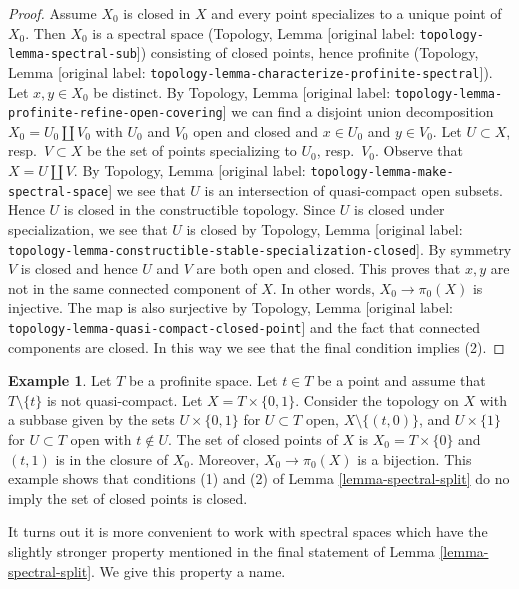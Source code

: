 \documentclass[10pt,a4paper]{article}
\theoremstyle{plain}
\theoremstyle{definition}
\newtheorem{example}[subsection]{Example}
\theoremstyle{remark}
\numberwithin{equation}{subsection}
\begin{document}
\begin{proof}
\medskip\noindent
Assume $X_0$ is closed in $X$ and every point specializes to a unique
point of $X_0$. Then $X_0$ is a spectral space
(Topology, Lemma \textnormal{[original label: \nolinkurl{topology-lemma-spectral-sub}]})
consisting of closed points, hence profinite
(Topology, Lemma \textnormal{[original label: \nolinkurl{topology-lemma-characterize-profinite-spectral}]}).
Let $x, y \in X_0$ be distinct. By
Topology, Lemma \textnormal{[original label: \nolinkurl{topology-lemma-profinite-refine-open-covering}]}
we can find a disjoint union decomposition
$X_0 = U_0 \amalg V_0$ with $U_0$ and $V_0$ open and closed
and $x \in U_0$ and $y \in V_0$.
Let $U \subset X$, resp.\ $V \subset X$
be the set of points specializing to $U_0$, resp.\ $V_0$.
Observe that $X = U \amalg V$.
By Topology, Lemma \textnormal{[original label: \nolinkurl{topology-lemma-make-spectral-space}]}
we see that $U$ is an intersection of quasi-compact open subsets.
Hence $U$ is closed in the constructible topology.
Since $U$ is closed under specialization, we see that
$U$ is closed by Topology, Lemma
\textnormal{[original label: \nolinkurl{topology-lemma-constructible-stable-specialization-closed}]}.
By symmetry $V$ is closed and hence $U$ and $V$ are both
open and closed.
This proves that $x, y$ are not in the same connected component of $X$.
In other words, $X_0 \to \pi_0(X)$ is injective. The map is also
surjective by
Topology, Lemma \textnormal{[original label: \nolinkurl{topology-lemma-quasi-compact-closed-point}]}
and the fact that connected components are closed.
In this way we see that the final condition implies (2).
\end{proof}

\begin{example}
\label{example-not-w-local}
Let $T$ be a profinite space. Let $t \in T$ be a point and assume
that $T \setminus \{t\}$ is not quasi-compact.
Let $X = T \times \{0, 1\}$. Consider the topology on $X$
with a subbase given by the sets
$U \times \{0, 1\}$ for $U \subset T$ open, $X \setminus \{(t, 0)\}$,
and $U \times \{1\}$ for $U \subset T$ open with $t \not \in U$.
The set of closed points of $X$ is $X_0 = T \times \{0\}$ and
$(t, 1)$ is in the closure of $X_0$.
Moreover, $X_0 \to \pi_0(X)$ is a bijection.
This example shows that conditions (1) and (2) of
Lemma \ref{lemma-spectral-split} do no imply the set of closed points
is closed.
\end{example}

\noindent
It turns out it is more convenient to work with spectral
spaces which have the slightly stronger property mentioned in
the final statement of Lemma \ref{lemma-spectral-split}.
We give this property a name.
\end{document}
